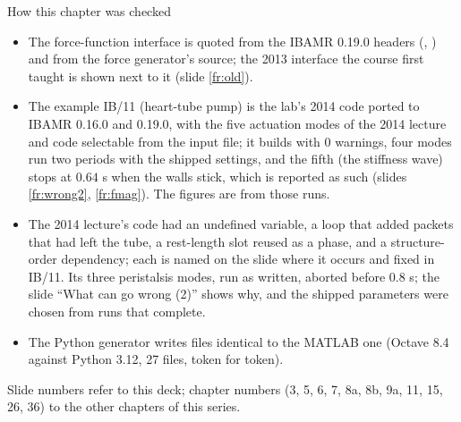 \documentclass[aspectratio=169,11pt]{beamer}
\begin{document}
\begin{frame}{How this chapter was checked}
\label{fr:checked}
\begin{itemize}\footnotesize
  \item The force-function interface is quoted from the IBAMR 0.19.0 headers (, ) and from the force generator's source; the 2013 interface the course first taught is shown next to it (slide \ref{fr:old}).
  \item The example IB/11 (heart-tube pump) is the lab's 2014  code ported to IBAMR 0.16.0 and 0.19.0, with the five actuation modes of the 2014 lecture and code selectable from the input file; it builds with 0 warnings, four modes run two periods with the shipped settings, and the fifth (the stiffness wave) stops at $0.64$ s when the walls stick, which is reported as such (slides \ref{fr:wrong2}, \ref{fr:fmag}). The figures are from those runs.
  \item The 2014 lecture's code had an undefined variable, a loop that added packets that had left the tube, a rest-length slot reused as a phase, and a structure-order dependency; each is named on the slide where it occurs and fixed in IB/11. Its three peristalsis modes, run as written, aborted before $0.8$ s; the slide ``What can go wrong (2)'' shows why, and the shipped parameters were chosen from runs that complete.
  \item The Python generator writes files identical to the MATLAB one (Octave 8.4 against Python 3.12, 27 files, token for token).
\end{itemize}
\begin{punchbox}
\footnotesize Slide numbers refer to this deck; chapter numbers (3, 5, 6, 7, 8a, 8b, 9a, 11, 15, 26, 36) to the other chapters of this series.
\end{punchbox}
\end{frame}
\end{document}
